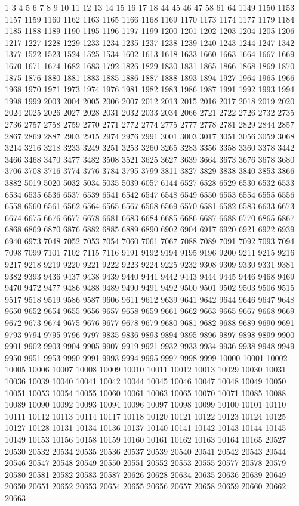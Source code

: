 1 3 4 5 6 7 8 9 10 11 12 13 14 15 16 17 18 44 45 46 47 58 61 64 1149 1150 1153 1157 1159 1160 1162 1163 1165 1166 1168 1169 1170 1173 1174 1177 1179 1184 1185 1188 1189 1190 1195 1196 1197 1199 1200 1201 1202 1203 1204 1205 1206 1217 1227 1228 1229 1233 1234 1235 1237 1238 1239 1240 1243 1244 1247 1342 1377 1522 1523 1524 1525 1534 1602 1613 1618 1633 1660 1663 1664 1667 1669 1670 1671 1674 1682 1683 1792 1826 1829 1830 1831 1865 1866 1868 1869 1870 1875 1876 1880 1881 1883 1885 1886 1887 1888 1893 1894 1927 1964 1965 1966 1968 1970 1971 1973 1974 1976 1981 1982 1983 1986 1987 1991 1992 1993 1994 1998 1999 2003 2004 2005 2006 2007 2012 2013 2015 2016 2017 2018 2019 2020 2024 2025 2026 2027 2028 2031 2032 2033 2034 2066 2721 2722 2726 2732 2735 2736 2757 2758 2759 2770 2771 2772 2774 2775 2777 2778 2781 2829 2844 2857 2867 2869 2887 2903 2915 2974 2976 2991 3001 3003 3017 3051 3056 3059 3068 3214 3216 3218 3233 3249 3251 3253 3260 3265 3283 3356 3358 3360 3378 3442 3466 3468 3470 3477 3482 3508 3521 3625 3627 3639 3664 3673 3676 3678 3680 3706 3708 3716 3774 3776 3784 3795 3799 3811 3827 3829 3838 3840 3853 3866 3882 5019 5020 5032 5034 5035 5039 6057 6144 6527 6528 6529 6530 6532 6533 6534 6535 6536 6537 6539 6541 6542 6547 6548 6549 6550 6553 6554 6555 6556 6558 6560 6561 6562 6564 6565 6567 6568 6569 6570 6581 6582 6583 6633 6673 6674 6675 6676 6677 6678 6681 6683 6684 6685 6686 6687 6688 6770 6865 6867 6868 6869 6870 6876 6882 6885 6889 6890 6902 6904 6917 6920 6921 6922 6939 6940 6973 7048 7052 7053 7054 7060 7061 7067 7088 7089 7091 7092 7093 7094 7098 7099 7101 7102 7115 7116 9191 9192 9194 9195 9196 9200 9211 9215 9216 9217 9218 9219 9220 9221 9222 9223 9224 9225 9232 9308 9309 9330 9331 9381 9382 9393 9436 9437 9438 9439 9440 9441 9442 9443 9444 9445 9446 9468 9469 9470 9472 9477 9486 9488 9489 9490 9491 9492 9500 9501 9502 9503 9506 9515 9517 9518 9519 9586 9587 9606 9611 9612 9639 9641 9642 9644 9646 9647 9648 9650 9652 9654 9655 9656 9657 9658 9659 9661 9662 9663 9665 9667 9668 9669 9672 9673 9674 9675 9676 9677 9678 9679 9680 9681 9682 9688 9689 9690 9691 9793 9794 9795 9796 9797 9835 9836 9893 9894 9895 9896 9897 9898 9899 9900 9901 9902 9903 9904 9905 9907 9919 9921 9932 9933 9934 9936 9938 9948 9949 9950 9951 9953 9990 9991 9993 9994 9995 9997 9998 9999 10000 10001 10002 10005 10006 10007 10008 10009 10010 10011 10012 10013 10029 10030 10031 10036 10039 10040 10041 10042 10044 10045 10046 10047 10048 10049 10050 10051 10053 10054 10055 10060 10061 10063 10065 10070 10071 10085 10088 10089 10090 10092 10093 10094 10096 10097 10098 10099 10100 10101 10110 10111 10112 10113 10114 10117 10118 10120 10121 10122 10123 10124 10125 10127 10128 10131 10134 10136 10137 10140 10141 10142 10143 10144 10145 10149 10153 10156 10158 10159 10160 10161 10162 10163 10164 10165 20527 20530 20532 20534 20535 20536 20537 20539 20540 20541 20542 20543 20544 20546 20547 20548 20549 20550 20551 20552 20553 20555 20577 20578 20579 20580 20581 20582 20583 20587 20626 20628 20634 20635 20636 20639 20649 20650 20651 20652 20653 20654 20655 20656 20657 20658 20659 20660 20662 20663